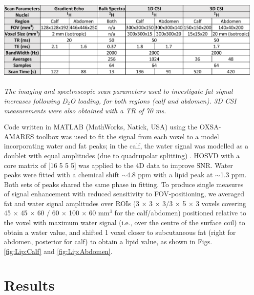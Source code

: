 \begin{table}
    \centering
    \includegraphics[width=1\textwidth]{Figures/Lipid/Scan_Details.png}
    \caption{\textit{The imaging and spectroscopic scan parameters used to investigate fat signal increases following D$_2$O loading, for both regions (calf and abdomen). 3D CSI measurements were also obtained with a \ac{TR} of 70 ms.}}
    \label{fig:Lip:Scan_Detail}
\end{table}

Code written in MATLAB (MathWorks, Natick, USA) using the OXSA-AMARES \cite{Purvis2017OXSA:MATLAB} toolbox was used to fit the signal from each voxel to a model incorporating water and fat peaks; in the calf, the water signal was modelled as a doublet with equal amplitudes (due to quadrupolar splitting) \cite{Gursan2022ResidualMuscle}. \ac{HOSVD} \cite{Bader2007EfficientTensors} with a core matrix of [16 5 5 5] was applied to the 4D data to improve \ac{SNR}. Water peaks were fitted with a chemical shift $\sim$4.8 ppm with a lipid peak at $\sim$1.3 ppm. Both sets of peaks shared the same phase in fitting. To produce single measures of signal enhancement with reduced sensitivity to \ac{FOV}-positioning, we averaged fat and water signal amplitudes over \ac{ROI}s (3 $\times$ 3 $\times$ 3/3 $\times$ 5 $\times$ 3 voxels covering 45 $\times$ 45 $\times$ 60 / 60 $\times$ 100 $\times$ 60 mm$^3$ for the calf/abdomen) positioned relative to the voxel with maximum water signal (i.e., over the centre of the surface coil) to obtain a water value, and shifted 1 voxel closer to subcutaneous fat (right for abdomen, posterior for calf) to obtain a lipid value, as shown in Figs. \ref{fig:Lip:Calf} and \ref{fig:Lip:Abdomen}.

\section{Results}


